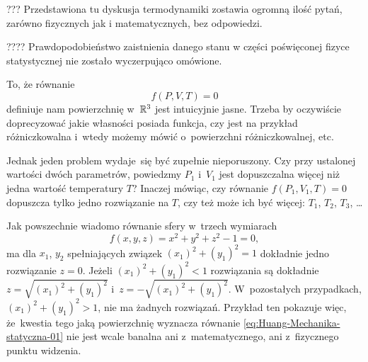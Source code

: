 \documentclass[a4paper,11pt]{article}
\numberwithin{equation}{section}
\begin{document}
\VerSpaceFour





\noindent
??? Przedstawiona tu dyskusja termodynamiki zostawia ogromną ilość pytań,
zarówno fizycznych jak i matematycznych, bez odpowiedzi.

\VerSpaceFour





\noindent
???? Prawdopodobieństwo zaistnienia danego stanu w części poświęconej fizyce
statystycznej nie zostało wyczerpująco omówione.







\noindent
{} To, że równanie
\begin{equation}
  \label{eq:Huang-Mechanika-statystyczna-01}
  f( P, V, T ) = 0
\end{equation}
definiuje nam powierzchnię w~$\mathbb{R}^{ 3 }$ jest intuicyjnie jasne. Trzeba by
oczywiście doprecyzować jakie własności posiada funkcja, czy jest na
przykład różniczkowalna i~wtedy możemy mówić o~powierzchni różniczkowalnej,
etc.

Jednak jeden problem wydaje~się być zupełnie nieporuszony. Czy przy
ustalonej wartości dwóch parametrów, powiedzmy $P_{ 1 }$ i~$V_{ 1 }$ jest
dopuszczalna więcej niż jedna wartość temperatury $T$? Inaczej mówiąc, czy
równanie $f( P_{ 1 }, V_{ 1 }, T ) = 0$ dopuszcza tylko jedno rozwiązanie na
$T$, czy też może ich być więcej: $T_{ 1 }$, $T_{ 2 }$, $T_{ 3 }$, \ldots

Jak powszechnie wiadomo równanie sfery w~trzech wymiarach
\begin{equation}
  \label{eq:Huang-Mechanika-statyczna-02}
  f( x, y, z ) = x^{ 2 } + y^{ 2 } + z^{ 2 } - 1 = 0,
\end{equation}
ma dla $x_{ 1 }$, $y_{ 2 }$ spełniających związek
$( x_{ 1 } )^{ 2 } + ( y_{ 1 } )^{ 2 } = 1$ dokładnie jedno rozwiązanie
$z = 0$. Jeżeli $( x_{ 1 } )^{ 2 } + ( y_{ 1 } )^{ 2 } < 1$ rozwiązania są
dokładnie $z = \sqrt{ ( x_{ 1 } )^{ 2 } + ( y_{ 1 } )^{ 2 } }$
i~$z = -\sqrt{ ( x_{ 1 } )^{ 2 } + ( y_{ 1 } )^{ 2 } }$. W~pozostałych
przypadkach, $( x_{ 1 } )^{ 2 } + ( y_{ 1 } )^{ 2 } > 1$, nie ma żadnych
rozwiązań. Przykład ten pokazuje więc, że~kwestia tego jaką powierzchnię
wyznacza równanie \eqref{eq:Huang-Mechanika-statyczna-01} nie jest wcale
banalna ani z~matematycznego, ani z~fizycznego punktu widzenia.
\end{document}
